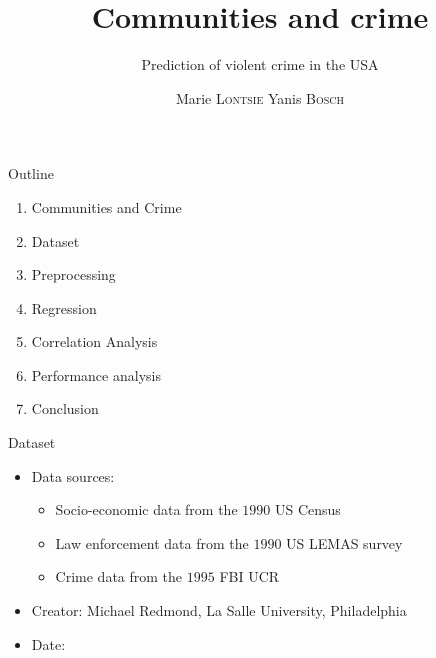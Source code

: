 \documentclass{beamer}
\begin{document}
	\begin{frame}
		\title{Communities and crime}
		\subtitle{Prediction of violent crime in the USA}
		\author{Marie \textsc{Lontsie} Yanis \textsc{Bosch}}
		\maketitle
	\end{frame}

	\begin{frame}{Outline}
		\begin{enumerate}
                        \item Communities and Crime
			\item Dataset
			\item Preprocessing
			\item Regression
			\item Correlation Analysis
			\item Performance analysis
			\item Conclusion
		\end{enumerate}
	\end{frame}

	\begin{frame}{Dataset}
		\begin{itemize}
			\item Data sources:
				\begin{itemize}
					\item Socio-economic data from the $1990$ US Census
					\item Law enforcement data from the $1990$ US LEMAS survey
					\item Crime data from the $1995$ FBI UCR
				\end{itemize}
			\item Creator: Michael Redmond, La Salle University, Philadelphia
			\item Date: \formatdate{13}{7}{2009}
		\end{itemize}
	\end{frame}
\end{document}
